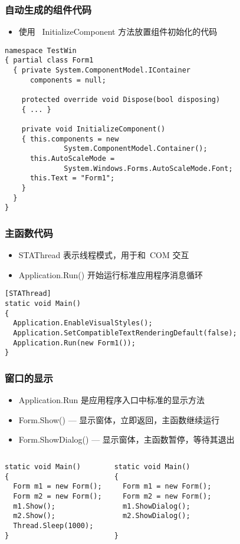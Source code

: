 \begin{frame}[fragile]
\frametitle{自动生成的组件代码}
\begin{itemize}
\item 使用 ~InitializeComponent 方法放置组件初始化的代码
\end{itemize}
\begin{lstlisting}
namespace TestWin
{ partial class Form1
  { private System.ComponentModel.IContainer 
      components = null;

    protected override void Dispose(bool disposing)
    { ... }

    private void InitializeComponent()
    { this.components = new 
              System.ComponentModel.Container();
      this.AutoScaleMode = 
              System.Windows.Forms.AutoScaleMode.Font;
      this.Text = "Form1";
    }
  }
}
\end{lstlisting}
\end{frame}

\begin{frame}[fragile]
\frametitle{主函数代码}
\begin{itemize}
\item STAThread 表示线程模式，用于和~COM 交互
\item Application.Run() 开始运行标准应用程序消息循环
\end{itemize}
\begin{lstlisting}
[STAThread]
static void Main()
{
  Application.EnableVisualStyles();
  Application.SetCompatibleTextRenderingDefault(false);
  Application.Run(new Form1());
}
\end{lstlisting}
\end{frame}

\begin{frame}[fragile]
\frametitle{窗口的显示}
\begin{itemize}
\item Application.Run 是应用程序入口中标准的显示方法
\item Form.Show() --- 显示窗体，立即返回，主函数继续运行
\item Form.ShowDialog() --- 显示窗体，主函数暂停，等待其退出
\end{itemize}
\begin{columns}
\begin{lstlisting}
static void Main()
{
  Form m1 = new Form();
  Form m2 = new Form();
  m1.Show();
  m2.Show();
  Thread.Sleep(1000);
}
\end{lstlisting}
\begin{lstlisting}
static void Main()
{
  Form m1 = new Form();
  Form m2 = new Form();
  m1.ShowDialog();
  m2.ShowDialog();

}

\end{lstlisting}
\end{columns}
\end{frame}


